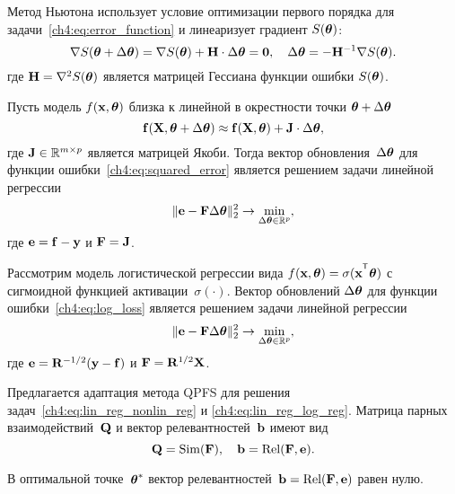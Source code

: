 \documentclass[11pt, a5paper]{dissert}
\begin{document}
Метод Ньютона использует условие оптимизации первого порядка для задачи~\eqref{ch4:eq:error_function} и линеаризует градиент $S (\boldsymbol{\theta})$:
\[
	\nabla S (\boldsymbol{\theta} + \Delta \boldsymbol{\theta}) = \nabla S(\boldsymbol{\theta}) + \mathbf{H} \cdot \Delta \boldsymbol{\theta} = \boldsymbol{0}, \quad
	\Delta \boldsymbol{\theta} = - \mathbf{H}^{-1} \nabla S(\boldsymbol{\theta}).
\]
где $\mathbf{H} = \nabla^2 S(\boldsymbol{\theta})$ является матрицей Гессиана функции ошибки $S(\boldsymbol{\theta})$.

\vspace{0.2cm}
\begin{theorem}
	Пусть модель $f (\mathbf{x} , \boldsymbol{\theta})$ близка к линейной в окрестности точки $\boldsymbol{\theta} + \Delta \boldsymbol{\theta}$
	\begin{equation}
		\mathbf{f}(\mathbf{X} , \boldsymbol{\theta} + \Delta \boldsymbol{\theta}) \approx \mathbf{f}(\mathbf{X} , \boldsymbol{\theta}) + \mathbf{J} \cdot \Delta  \boldsymbol{\theta},
		\label{ch4:eq:linearization}
	\end{equation}
	где $\mathbf{J} \in \mathbb{R}^{m \times p}$ является матрицей Якоби.
	Тогда вектор обновления~$\Delta \boldsymbol{\theta}$ для функции ошибки~\eqref{ch4:eq:squared_error} является решением задачи линейной регрессии
	\begin{equation}
		\| \mathbf{e} - \mathbf{F} \Delta \boldsymbol{\theta} \|_2^2 \rightarrow \min_{\Delta \boldsymbol{\theta} \in \mathbb{R}^{p}},
		\label{ch4:eq:lin_reg_nonlin_reg}
	\end{equation}
	где $\mathbf{e} = \mathbf{f} - \mathbf{y}$ и $\mathbf{F} = \mathbf{J}$.
\end{theorem}

\vspace{0.2cm}
\begin{theorem}
Рассмотрим модель логистической регрессии вида $f(\bx , \btheta) = \sigma(\bx^{\T} \btheta)$ с сигмоидной функцией активации~$\sigma(\cdot)$. 
Вектор обновлений $\Delta \boldsymbol{\theta}$ для функции ошибки~\eqref{ch4:eq:log_loss} является решением задачи линейной регрессии
\begin{equation}
	\| \mathbf{e} - \mathbf{F} \Delta \boldsymbol{\theta} \|_2^2 \rightarrow \min_{\Delta \boldsymbol{\theta} \in \mathbb{R}^{p}},
	\label{ch4:eq:lin_reg_log_reg}
\end{equation}
где $\mathbf{e} = \mathbf{R}^{-1/2} (\mathbf{y} - \mathbf{f})$ и $\mathbf{F} = \mathbf{R}^{1/2}\mathbf{X}$.
\end{theorem}

Предлагается адаптация метода QPFS для решения задач~\eqref{ch4:eq:lin_reg_nonlin_reg} и \eqref{ch4:eq:lin_reg_log_reg}. 
Матрица парных взаимодействий~$\mathbf{Q}$ и вектор релевантностей~$\mathbf{b}$ имеют вид
\[
	\mathbf{Q} = \text{Sim} (\mathbf{F}), \quad \mathbf{b} = \text{Rel} (\mathbf{F}, \mathbf{e}).
\]
\begin{statement}
	В оптимальной точке~$\boldsymbol{\theta}^*$ вектор релевантностей~$\mathbf{b} = \text{Rel} (\mathbf{F}, \mathbf{e})$ равен нулю.
\end{statement}
\vspace{0.2cm}
\end{document}
